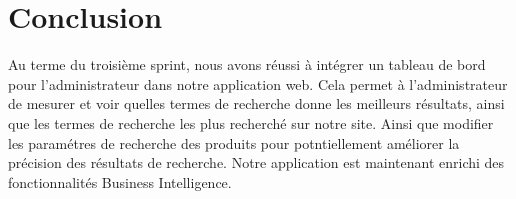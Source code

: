 \section{Conclusion}
\noindent
Au terme du troisième sprint, nous avons réussi à intégrer un tableau de bord pour
l'administrateur dans notre application web. Cela permet à l'administrateur de mesurer et voir quelles termes de recherche donne les meilleurs résultats, ainsi que les termes de recherche les plus recherché sur notre site. Ainsi que modifier les paramétres de recherche des produits pour potntiellement améliorer la précision des résultats de recherche. Notre application est maintenant enrichi des fonctionnalités Business Intelligence.

